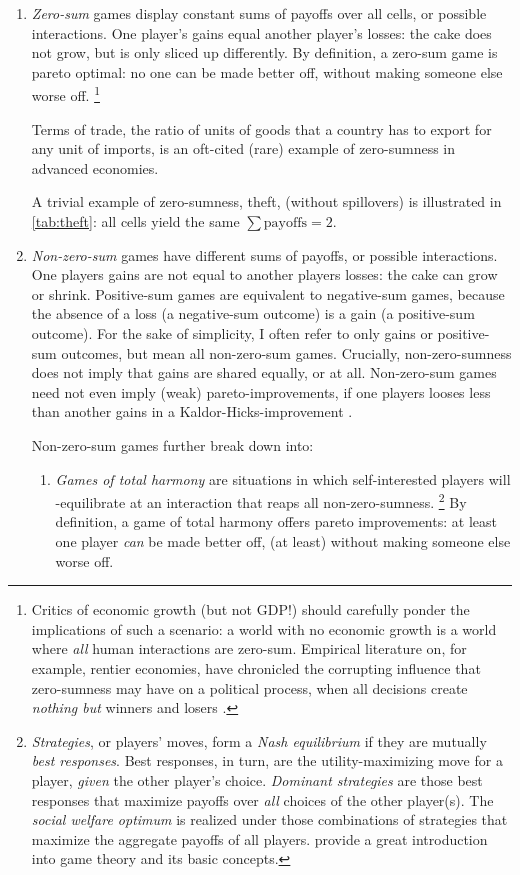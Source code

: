 \begin{enumerate}
	\item
	\emph{Zero-sum} games display constant sums of payoffs over all cells, or possible interactions.
	One player's gains equal another player's losses:
	the cake does not grow, but is only sliced up differently.
	By definition, a zero-sum game is pareto optimal:
	no one can be made better off, without making someone else worse off.
	\footnote{
		Critics of economic growth (but not \gls{GDP}!) should carefully ponder the implications of such a scenario:
		a world with no economic growth is a world where \emph{all} human interactions are zero-sum.
		Empirical literature on, for example, rentier economies, have chronicled the corrupting influence that zero-sumness may have on a political process, when all decisions create \emph{nothing but} winners and losers \citep{Beblawi1990}.
	}

	Terms of trade, the ratio of units of goods that a country has to export for any unit of imports, is an oft-cited (rare) example of zero-sumness in advanced economies.%

	A trivial example of zero-sumness, theft, (without spillovers) is illustrated in \autoref{tab:theft}:
	all cells yield the same $\sum{\text{payoffs}}=2$.

	\item
	\emph{Non-zero-sum} games have different sums of payoffs, or possible interactions.
	One players gains are not equal to another players losses:
	the cake can grow or shrink.
	Positive-sum games are equivalent to negative-sum games, because the absence of a loss (a negative-sum outcome) is a gain (a positive-sum outcome).
	For the sake of simplicity, I often refer to only gains or positive-sum outcomes, but mean all non-zero-sum games.
	Crucially, non-zero-sumness does not imply that gains are shared equally, or at all.
	Non-zero-sum games need not even imply (weak) pareto-improvements, if one players looses less than another gains in a Kaldor-Hicks-improvement \citep{Kaldor1939,Hicks1939}.

	Non-zero-sum games further break down into:

	\begin{enumerate}
		\item
		\emph{Games of total harmony} are situations in which self-interested players will \citeauthor{Nash1951}-equilibrate at an interaction that reaps all non-zero-sumness.
		\footnote{
			\emph{Strategies}, or players' moves, form a \emph{Nash equilibrium} if they are mutually \emph{best responses}.
			Best responses, in turn, are the utility-maximizing move for a player, \emph{given} the other player's choice.
			\emph{Dominant strategies} are those best responses that maximize payoffs over \emph{all} choices of the other player(s).
			The \emph{social welfare optimum} is realized under those combinations of strategies that maximize the aggregate payoffs of all players.
			\cite{Kleinberg-2009-oz} provide a great introduction into game theory and its basic concepts.
		}
		By definition, a game of total harmony offers pareto improvements:
		at least one player \emph{can} be made better off, (at least) without making someone else worse off.


\end{enumerate}
\end{enumerate}
